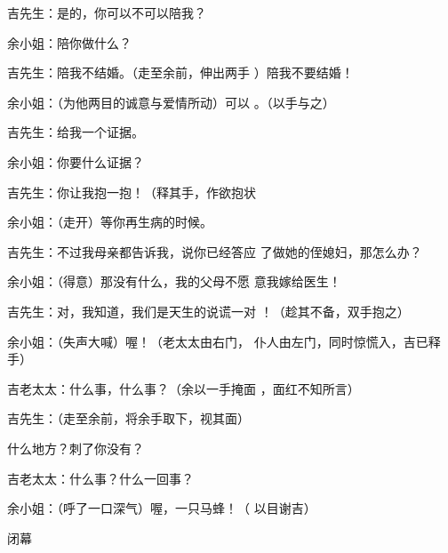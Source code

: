 \documentclass{article}
\begin{document}
吉先生：是的，你可以不可以陪我？ 


余小姐：陪你做什么？ 

吉先生：陪我不结婚。（走至余前，伸出两手
）陪我不要结婚！ 

余小姐：（为他两目的诚意与爱情所动）可以
。（以手与之） 


吉先生：给我一个证据。 


余小姐：你要什么证据？ 

\newpage

吉先生：你让我抱一抱！（释其手，作欲抱状


余小姐：（走开）等你再生病的时候。 

吉先生：不过我母亲都告诉我，说你已经答应
了做她的侄媳妇，那怎么办？ 


余小姐：（得意）那没有什么，我的父母不愿
意我嫁给医生！ 

吉先生：对，我知道，我们是天生的说谎一对
！（趁其不备，双手抱之） 

余小姐：（失声大喊）喔！（老太太由右门，
仆人由左门，同时惊慌入，吉已释手） 

吉老太太：什么事，什么事？（余以一手掩面
，面红不知所言） 

吉先生：（走至余前，将余手取下，视其面）
\newpage

什么地方？刺了你没有？ 


吉老太太：什么事？什么一回事？ 

余小姐：（呼了一口深气）喔，一只马蜂！（
以目谢吉） 

闭幕
\end{document}

